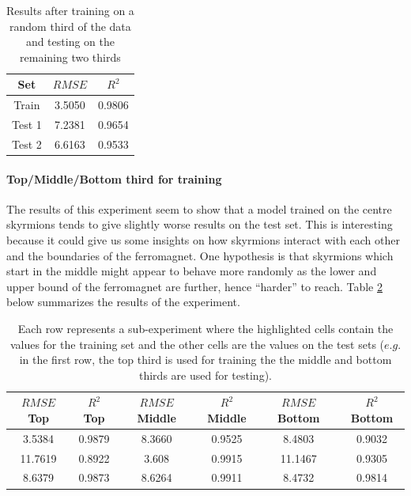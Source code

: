 \documentclass[a4paper]{article}
\begin{document}
  \begin{table}[h!]
    \centering
    \begin{tabular}{|c | c c|} 
     \hline
     Set & $RMSE$ & $R^2$ \\ [0.5ex] 
     \hline\hline
     Train & 3.5050 & 0.9806 \\ 
     Test 1 & 7.2381 & 0.9654 \\
     Test 2 & 6.6163 & 0.9533 \\
     \hline
    \end{tabular}
    \caption{Results after training on a random third of the data and testing on the remaining two thirds}
    \label{table:random_third}
  \end{table}

  \paragraph{Top/Middle/Bottom third for training}
  
  The results of this experiment seem to show that a model trained on the centre skyrmions tends to give slightly worse results on the test set. This is interesting because it could give us some insights on how skyrmions interact with each other and the boundaries of the ferromagnet. One hypothesis is that skyrmions which start in the middle might appear to behave more randomly as the lower and upper bound of the ferromagnet are further, hence ``harder'' to reach. Table \ref{table:thirds} below summarizes the results of the experiment.

  \begin{table}[h!]
    \centering
    \begin{tabular}{|c c c c c c|} 
     \hline
     $RMSE$ Top & $R^2$ Top & $RMSE$ Middle & $R^2$ Middle & $RMSE$ Bottom & $R^2$ Bottom \\ [0.5ex] 
     \hline\hline
     \cellcolor{blue!25} 3.5384 & \cellcolor{blue!25} 0.9879 & 8.3660 & 0.9525 & 8.4803 & 0.9032 \\ 
     11.7619 & 0.8922 & \cellcolor{blue!25}3.608 & \cellcolor{blue!25}0.9915 & 11.1467 & 0.9305 \\
     8.6379 & 0.9873 & 8.6264 & 0.9911 & \cellcolor{blue!25}8.4732 & \cellcolor{blue!25}0.9814 \\
     \hline
    \end{tabular}
    \caption{Each row represents a sub-experiment where the highlighted cells contain the values for the training set and the other cells are the values on the test sets ($e.g.$ in the first row, the top third is used for training the the middle and bottom thirds are used for testing).}
    \label{table:thirds}
  \end{table}
\end{document}
